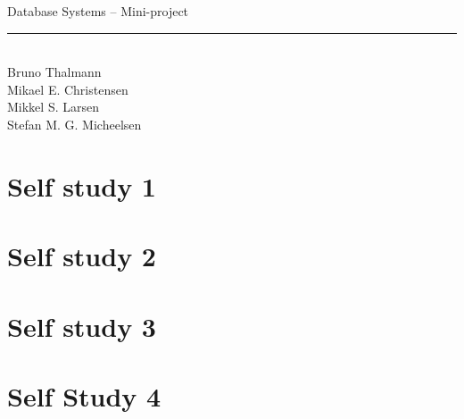 
\newcommand{\HRule}{\rule{\linewidth}{0.5mm}}


\begin{titlepage}
\centering
{\LARGE Database Systems -- Mini-project}
\HRule \\[0.5cm]
Bruno Thalmann\\
			Mikael E. Christensen\\
			Mikkel S. Larsen\\
			Stefan M. G. Micheelsen
\end{titlepage}

\chapter{Self study 1}


\chapter{Self study 2}


\chapter{Self study 3}


\chapter{Self Study 4}


